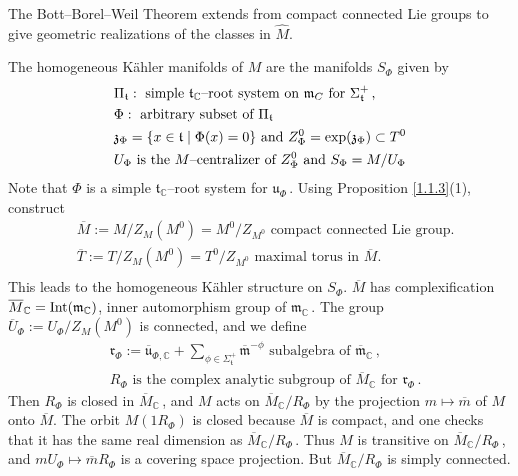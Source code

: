 \documentclass{conm-p-l}
\def\gm{\mathfrak{m}}
\def\gr{\mathfrak{r}}
\def\gt{\mathfrak{t}}
\def\gu{\mathfrak{u}}
\def\gz{\mathfrak{z}}
\def\Int{{\rm Int}}
\def\C{\mathbb{C}}
\begin{document}
The Bott--Borel--Weil Theorem extends from compact connected Lie groups to 
give geometric realizations of the classes in $\widehat{M}$.

The homogeneous K\"ahler manifolds of $M$ are the manifolds $S_\Phi$ given by
\begin{equation}\label{1.1.4}
\begin{aligned}
& \Pi_\gt: \text{ simple $\gt_\C$--root system on 
	$\gm_C$ for $\Sigma^+_\gt$\,,} \\
& \Phi: \text{ arbitrary subset of } \Pi_\gt\,\, \\
& \gz_\Phi = \{x \in \gt \mid \Phi(x) = 0\} \text{ and }
	Z_\Phi^0 = \exp(\gz_\Phi) \subset T^0 \\
& U_\Phi \text{ is the $M$--centralizer of 
	$Z_\Phi^0$ and } S_\Phi = M/U_\Phi \\
\end{aligned}
\end{equation}
Note that $\Phi$ is a simple $\gt_\C$--root system for $\gu_\Phi$\,.
Using Proposition \ref{1.1.3}(1),  construct
\begin{equation}\label{1.1.6}
\begin{aligned}
& \overline{M}:= M/Z_M(M^0) = M^0/Z_{M^0} \text{ compact connected Lie group.}\\
& \overline{T}:= T/Z_M(M^0) = T^0/Z_{M^0} 
	\text{ maximal torus in }\overline{M}.\\
\end{aligned}
\end{equation}
This leads to the homogeneous K\"ahler structure on $S_\Phi$.  $\overline{M}$
has complexification $\overline{M}_\C = \Int(\gm_\C)$, inner automorphism 
group of $\gm_\C$\,.  The group $\overline{U}_\Phi := U_\Phi/Z_M(M^0)$ is
connected, and we define
\begin{equation}\label{1.1.7}
\begin{aligned}
&\gr_\Phi := \overline{\gu}_{\Phi,\C} + 
	{\sum}_{\phi\in\Sigma_\gt^+} \overline{\gm}^{-\phi}
	\text{ subalgebra of } \overline{\gm}_\C\,, \\
& R_\Phi \text{ is the complex analytic subgroup of } \overline{M}_\C
	\text{ for } \gr_\Phi\,.
\end{aligned}
\end{equation}
Then $R_\Phi$ is closed in $\overline{M}_\C$\,, and $M$ acts on 
$\overline{M}_\C/R_\Phi$ by the projection $m \mapsto \overline{m}$ of $M$
onto $\overline{M}$.  The orbit $M(1R_\Phi)$ is closed because $\overline{M}$
is compact, and one checks that it has the same real dimension as
$\overline{M}_\C/R_\Phi$\,.  Thus $M$ is transitive on 
$\overline{M}_\C/R_\Phi$\,, and $mU_\Phi \mapsto \overline{m}R_\Phi$ is a
covering space projection.  But $\overline{M}_\C/R_\Phi$ is simply connected.
\end{document}
